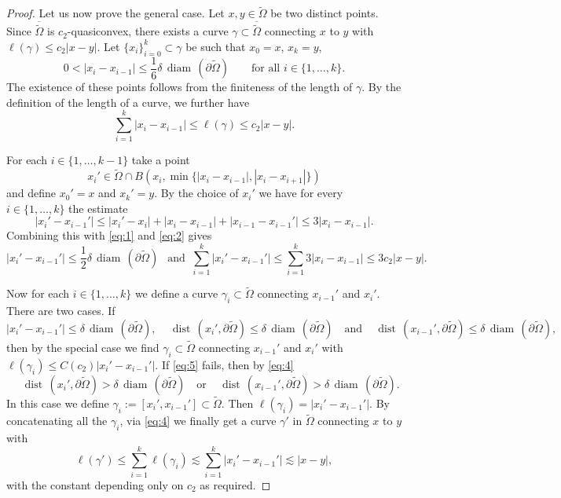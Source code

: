 \documentclass[reqno,11pt]{amsart}
\def\dist{{\mathop\mathrm{\,dist\,}}}
\def\wz{\widetilde}
\def\ls{\lesssim}
\def\diam{{\mathop\mathrm{\,diam\,}}}
\numberwithin{equation}{section}
\theoremstyle{remark}
\begin{document}
\begin{proof}
Let us now prove the general case. Let $x, y \in \widetilde\Omega$ be two distinct points. Since $\overline{\widetilde\Omega}$ is $c_2$-quasiconvex,
there exists a curve $\gamma \subset \overline{\widetilde\Omega}$ connecting $x$ to $y$ with $\ell(\gamma) \le c_2 |x-y|$.
Let $\{x_i\}_{i=0}^k \subset \gamma$ be such that $x_0 = x$, $x_k = y$,
\begin{equation}\label{eq:1}
 0 < |x_i-x_{i-1}| \le \frac{1}{6}\delta\diam(\partial \widetilde\Omega) \qquad \text{for all }i \in \{1,\dots, k\}. 
\end{equation}
The existence of these points follows from the finiteness of the length of $\gamma$.
By the definition of the length of a curve, we further have
\begin{equation}\label{eq:2}
 \sum_{i=1}^k|x_i-x_{i-1}| \le \ell(\gamma) \le c_2 |x-y|.
\end{equation}


For each $i \in \{1,\dots, k-1\}$ take a point
\[
x_i' \in \widetilde \Omega \cap B(x_i,\min\{|x_i-x_{i-1}|, |x_i-x_{i+1}|\}) 
\]
and define $x_0' = x$ and $x_k'=y$.
By the choice of $x_i'$  we have for every $i \in \{1,\dots, k\}$ the estimate
\begin{equation}\label{eq:3}
 |x_i'-x_{i-1}'| \le |x_i'-x_i| + |x_i - x_{i-1}| + |x_{i-1}-x_{i-1}'| \le 3|x_i-x_{i-1}|.
\end{equation}
Combining this with \eqref{eq:1} and \eqref{eq:2}  gives
\begin{equation}\label{eq:4}
  |x_i'-x_{i-1}'| \le \frac{1}{2}\delta\diam(\partial \widetilde\Omega) \ \ \text{ and }  \ \sum_{i=1}^k|x_i'-x_{i-1}'|\le \sum_{i=1}^k 3|x_i-x_{i-1}| \le 3c_2 |x-y|.
\end{equation}

Now for each $i \in \{1,\dots, k\}$ we define a curve $\gamma_i\subset \wz \Omega$ connecting $x_{i-1}'$ and $x_i'$. There are two cases. If
\begin{equation}\label{eq:5}
|x_i'-x_{i-1}'| \le \delta\diam(\partial\widetilde\Omega), \quad \dist(x_i',\partial\widetilde\Omega)\le \delta\diam(\partial\widetilde\Omega)
\quad \text{and} \quad \dist({x_{i-1}',\partial\widetilde\Omega})\le \delta\diam(\partial\widetilde\Omega),
\end{equation}
then by the special case we find $\gamma_i \subset \widetilde\Omega$ connecting $x_{i-1}'$ and $x_i'$ with $\ell(\gamma_i) \le C(c_2) |x_i'-x_{i-1}'|$.
If \eqref{eq:5} fails, then by \eqref{eq:4}
\[
 \quad \dist(x_i',\partial\widetilde\Omega)> \delta\diam(\partial\widetilde\Omega)
\quad \text{or} \quad \dist({x_{i-1}',\partial\widetilde\Omega})> \delta\diam(\partial\widetilde\Omega).
\]
In this case we define $\gamma_i := [x_i',x_{i-1}'] \subset \widetilde\Omega$. Then $\ell(\gamma_i) = |x_i'-x_{i-1}'|$. By concatenating all the $\gamma_i$, via \eqref{eq:4} we finally get a curve $\gamma'$ in $\widetilde\Omega$ connecting $x$ to $y$ with
\[
 \ell(\gamma') \le \sum_{i=1}^k\ell(\gamma_i) \ls \sum_{i=1}^k |x_i'-x_{i-1}'| \ls |x-y|,
\]
with the constant depending only on $c_2$ as required.




\end{proof}
\end{document}

